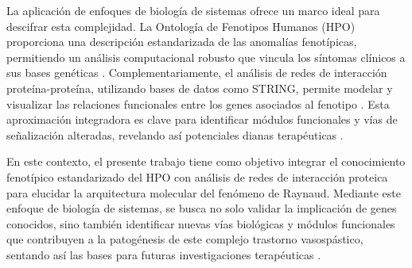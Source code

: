 La aplicación de enfoques de biología de sistemas ofrece un marco ideal para descifrar esta complejidad. La Ontología de Fenotipos Humanos (HPO) proporciona una descripción estandarizada de las anomalías fenotípicas, permitiendo un análisis computacional robusto que vincula los síntomas clínicos a sus bases genéticas \cite{Khler2021, Robinson2008}. Complementariamente, el análisis de redes de interacción proteína-proteína, utilizando bases de datos como STRING, permite modelar y visualizar las relaciones funcionales entre los genes asociados al fenotipo \cite{Szklarczyk2025}. Esta aproximación integradora es clave para identificar módulos funcionales y vías de señalización alteradas, revelando así potenciales dianas terapéuticas \cite{Consortium}.

En este contexto, el presente trabajo tiene como objetivo integrar el conocimiento fenotípico estandarizado del HPO con análisis de redes de interacción proteica para elucidar la arquitectura molecular del fenómeno de Raynaud. Mediante este enfoque de biología de sistemas, se busca no solo validar la implicación de genes conocidos, sino también identificar nuevas vías biológicas y módulos funcionales que contribuyen a la patogénesis de este complejo trastorno vasospástico, sentando así las bases para futuras investigaciones terapéuticas \cite{Naylor2010, Fischer2025}.
